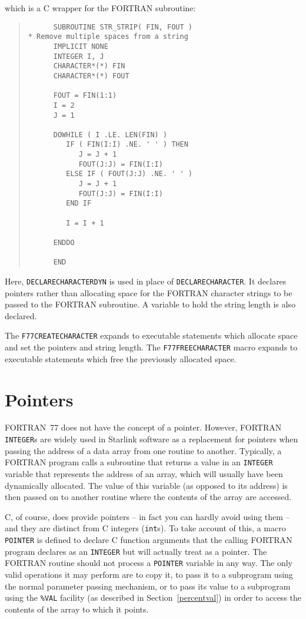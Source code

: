 \documentclass[twoside,11pt]{article}
\newcommand{\htmlref}[2]{#1}
\newcommand{\latex}[1]{#1}
\newcommand{\xlabel}[1]{}
\renewcommand{\_}{\texttt{\symbol{95}}}
\begin{document}
which is a C wrapper for the FORTRAN subroutine:
{\small \begin{quote} \begin{verbatim}
      SUBROUTINE STR_STRIP( FIN, FOUT )
* Remove multiple spaces from a string
      IMPLICIT NONE
      INTEGER I, J
      CHARACTER*(*) FIN
      CHARACTER*(*) FOUT
      
      FOUT = FIN(1:1)
      I = 2
      J = 1
      
      DOWHILE ( I .LE. LEN(FIN) )
         IF ( FIN(I:I) .NE. ' ' ) THEN
            J = J + 1
            FOUT(J:J) = FIN(I:I)
         ELSE IF ( FOUT(J:J) .NE. ' ' )
            J = J + 1
            FOUT(J:J) = FIN(I:I)
         END IF

         I = I + 1

      ENDDO

      END
\end{verbatim} \end{quote} }
Here,
\htmlref{\texttt{DECLARE\_CHARACTER\_DYN}}{DECLARE_CHARACTER_DYN}
is used in place of 
\htmlref{\texttt{DECLARE\_CHARACTER}}{DECLARE_CHARACTER}\@.
It declares pointers rather than allocating space for the FORTRAN character
strings to be passed to the FORTRAN subroutine. A variable to hold the string
length is also declared.

The 
\htmlref{\texttt{F77\_CREATE\_CHARACTER}}{F77_CREATE_CHARACTER}
expands to executable statements which allocate space and set the pointers and 
string length. The 
\htmlref{\texttt{F77\_\-FREE\_\-CHARACTER}}{F77_FREE_type}
macro expands to executable statements which free the previously allocated
space.

\section{\xlabel{pointers}\label{f77_pointers}Pointers}

FORTRAN~77 does not have the concept of a pointer. However, FORTRAN
\texttt{INTEGER}s are widely used in Starlink software as a
replacement for pointers when passing the address of a data array from
one routine to another. Typically, a FORTRAN program calls a
subroutine that returns a value in an \texttt{INTEGER} variable that
represents the address of an array, which will usually have been
dynamically allocated. The value of this variable (as opposed to its
address) is then passed on to another routine where the contents of
the array are accessed.

C, of course, does provide pointers -- in fact you can hardly avoid
using them -- and they are distinct from C integers (\texttt{int}s). To
take account of this, a macro 
\htmlref{\texttt{POINTER}}{type}
is defined to declare C
function arguments that the calling FORTRAN program declares as an
\texttt{INTEGER} but will actually treat as a pointer. The FORTRAN
routine should not process a \texttt{POINTER} variable in any way.
The only valid operations it may perform are to copy it, to pass it to
a subprogram using the normal parameter passing mechanism, or to pass
its value to a subprogram using the 
\htmlref{\texttt{\%VAL} facility}{percentval}\latex{ (as
described in Section~\ref{percentval})} in order to access the contents
of the array to which it points.
\end{document}

